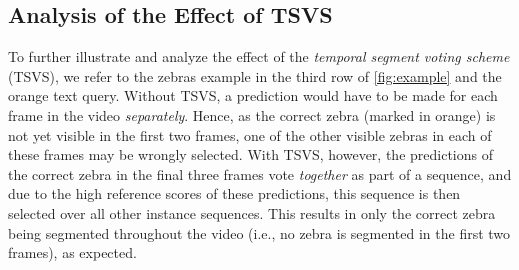 \documentclass[10pt,twocolumn,letterpaper]{article}
\begin{document}
\subsection{Analysis of the Effect of TSVS}
\label{tsvs_effect_analysis}
To further illustrate and analyze the effect of the \textit{temporal segment voting scheme} (TSVS), we refer to the zebras example in the third row of \cref{fig:example} and the orange text query. Without TSVS, a prediction would have to be made for each frame in the video \textit{separately}. Hence, as the correct zebra (marked in orange) is not yet visible in the first two frames, one of the other visible zebras in each of these frames may be wrongly selected. With TSVS, however, the predictions of the correct zebra in the final three frames vote \textit{together} as part of a sequence, and due to the high reference scores of these predictions, this sequence is then selected over all other instance sequences. This results in only the correct zebra being segmented throughout the video (i.e., no zebra is segmented in the first two frames), as expected.
 
\end{document}
